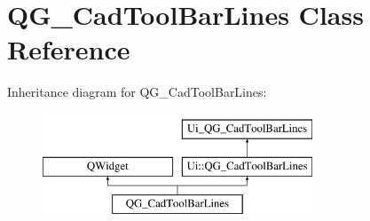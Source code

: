 \hypertarget{classQG__CadToolBarLines}{\section{Q\-G\-\_\-\-Cad\-Tool\-Bar\-Lines Class Reference}
\label{classQG__CadToolBarLines}
}
Inheritance diagram for Q\-G\-\_\-\-Cad\-Tool\-Bar\-Lines\-:\begin{figure}[H]
\begin{center}
\leavevmode
\includegraphics[height=3.000000cm]{classQG__CadToolBarLines}
\end{center}
\end{figure}
